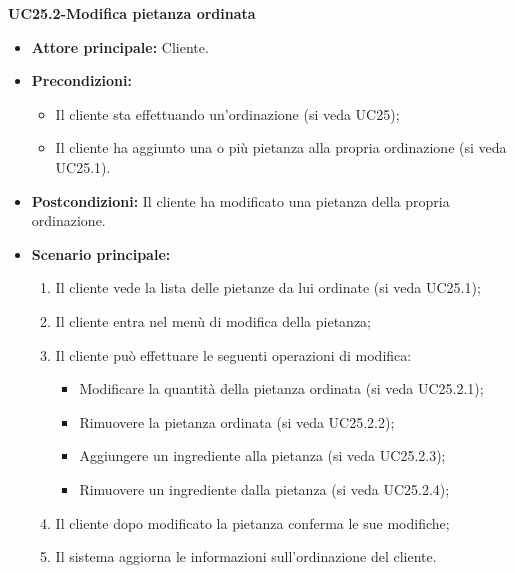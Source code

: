 \textbf{UC25.2-Modifica pietanza ordinata}
\begin{itemize}
\item \textbf{Attore principale:} Cliente.
\item \textbf{Precondizioni:} 
\begin{itemize}
    \item Il cliente sta effettuando un'ordinazione (si veda UC25);
    \item Il cliente ha aggiunto una o più pietanza alla propria ordinazione (si veda UC25.1).
\end{itemize}
\item \textbf{Postcondizioni:} Il cliente ha modificato una pietanza della propria ordinazione.
\item \textbf{Scenario principale:}
\begin{enumerate}
    \item Il cliente vede la lista delle pietanze da lui ordinate (si veda UC25.1);
    \item Il cliente entra nel menù di modifica della pietanza;
    \item Il cliente può effettuare le seguenti operazioni di modifica:
    \begin{itemize}
        \item Modificare la quantità della pietanza ordinata (si veda UC25.2.1);
        \item Rimuovere la pietanza ordinata (si veda UC25.2.2);
        \item Aggiungere un ingrediente alla pietanza (si veda UC25.2.3);
        \item Rimuovere un ingrediente dalla pietanza (si veda UC25.2.4);
    \end{itemize}
    \item Il cliente dopo modificato la pietanza conferma le sue modifiche;
    \item Il sistema aggiorna le informazioni sull'ordinazione del cliente.
\end{enumerate}
\end{itemize}

